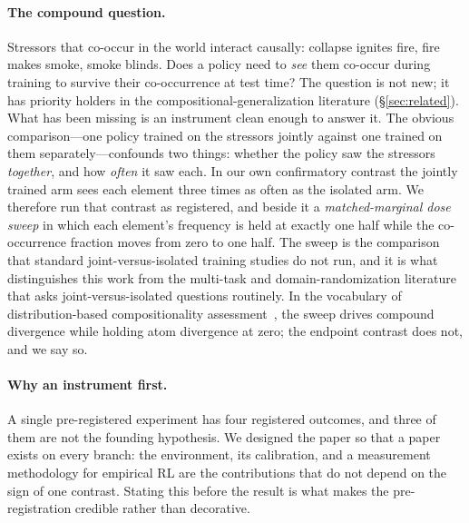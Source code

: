 \paragraph{The compound question.}
Stressors that co-occur in the world interact causally: collapse ignites
fire, fire makes smoke, smoke blinds. Does a policy need to \emph{see} them
co-occur during training to survive their co-occurrence at test time? The
question is not new; it has priority holders in the compositional-generalization
literature (\S\ref{sec:related}). What has been missing is an instrument clean
enough to answer it. The obvious comparison---one policy trained on the
stressors jointly against one trained on them separately---confounds two
things: whether the policy saw the stressors \emph{together}, and how
\emph{often} it saw each. In our own confirmatory contrast the jointly trained
arm sees each element three times as often as the isolated arm. We therefore
run that contrast as registered, and beside it a \emph{matched-marginal dose
sweep} in which each element's frequency is held at exactly one half while
the co-occurrence fraction moves from zero to one half. The sweep is the
comparison that standard joint-versus-isolated training studies do not run,
and it is what distinguishes this work from the multi-task and
domain-randomization literature that asks joint-versus-isolated questions
routinely. In the vocabulary of distribution-based compositionality
assessment~\citep{keysers2020}, the sweep drives compound divergence while
holding atom divergence at zero; the endpoint contrast does not, and we say
so.

\paragraph{Why an instrument first.}
A single pre-registered experiment has four registered outcomes, and three of
them are not the founding hypothesis. We designed the paper so that a paper
exists on every branch: the environment, its calibration, and a measurement
methodology for empirical RL are the contributions that do not depend on the
sign of one contrast. Stating this before the result is what makes the
pre-registration credible rather than decorative.

